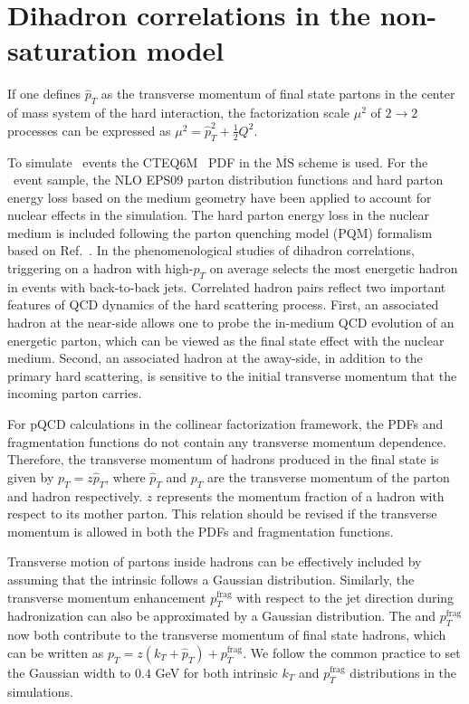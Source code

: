 \section{Dihadron correlations in the non-saturation model} \label{sec:dihadron_nonsat_mc}

If one defines $\hat{p}_{T}$ as the transverse momentum
of final state partons in the center of mass system of the hard interaction, the
factorization scale $\mu^{2}$ of $2\rightarrow 2$ processes can be expressed
as $\mu^{2} = \hat{p}_{T}^{2} + \frac{1}{2}Q^{2}$.


To simulate \ep\ events the CTEQ6M~\cite{Pumplin:2002vw} PDF in the
$\overline{\textrm{MS}}$ scheme is used. For the \eA\ event sample, the NLO
EPS09 parton distribution functions \cite{Eskola:2009uj} and hard parton energy
loss based on the medium geometry have been applied to account for nuclear
effects in the simulation. 
The hard parton energy loss in the nuclear medium is included
following the parton quenching model (PQM) formalism based on
Ref.~\cite{Salgado:2003gb}.
In the phenomenological studies of dihadron correlations, triggering on a hadron
with high-$p_T$ on average selects the most energetic hadron in events with 
back-to-back jets. Correlated hadron pairs reflect two important features of QCD 
dynamics of the hard scattering process.
First, an associated hadron at the near-side allows one to probe the in-medium
QCD evolution of an energetic parton, which can be viewed as the final state
effect with the nuclear medium. Second, an associated hadron at the away-side,
in addition to the primary hard scattering, is sensitive to the initial
transverse momentum that the incoming parton carries.

For pQCD calculations in the collinear factorization framework, the PDFs and fragmentation
functions do not contain any transverse momentum dependence. Therefore, the
transverse momentum of hadrons produced in the final state is given by
$p_{T}=z\hat{p}_{T}$, where $\hat{p}_{T}$ and $p_{T}$ are the transverse
momentum of the parton and hadron respectively. $z$ represents the momentum fraction
of a hadron with respect to its mother parton. This relation should be revised
if the transverse momentum is allowed in both the PDFs and fragmentation
functions.

Transverse motion of partons inside hadrons can be effectively included by
assuming that the intrinsic \kt follows a Gaussian distribution. Similarly, the
transverse momentum enhancement  $p_{T}^{\textrm{frag}}$ with respect to the jet
direction during hadronization can also be approximated by a Gaussian
distribution. The \kt and $p_{T}^{\textrm{frag}}$ now
both contribute to the transverse momentum of final state hadrons, which can be
written as $p_{T} =z(k_{T}+\hat{p}_{T})+p_{T}^{\textrm{frag}}$. We follow the
common practice to set the Gaussian width to $0.4$ GeV for both intrinsic $k_{T}$ 
and $p_{T}^{\textrm{frag}}$ distributions in the simulations.

